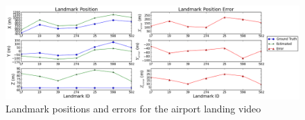 \begin{figure}[h]
\centering
\includegraphics[width=17cm, keepaspectratio=true]
{./Figures/fltfig/airport/Figure20.png}
\caption{Landmark positions and errors for the airport landing video}
\label{fltfig:15}
\end{figure}

